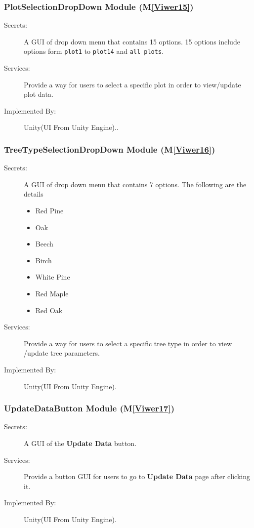 \documentclass[12pt, titlepage]{article}
\newcommand{\mref}[1]{M\ref{#1}}
\newcommand{\UUI}{Unity(UI From Unity Engine).}
\begin{document}
\subsubsection{PlotSelectionDropDown Module (\mref{Viwer15})}
\begin{description}
\item[Secrets:] A GUI of drop down menu that contains 15 options. 15 options include options
form \verb|plot1| to \verb|plot14| and \verb|all plots|.
\item[Services:] Provide a way for users to select a specific plot in order to view/update
plot data.
\item[Implemented By:] \UUI.
\end{description}

\subsubsection{TreeTypeSelectionDropDown Module (\mref{Viwer16})}
\begin{description}
\item[Secrets:] A GUI of drop down menu that contains 7 options. The following are the details
\begin{itemize}
\item Red Pine
\item Oak
\item Beech
\item Birch
\item White Pine
\item Red Maple
\item Red Oak
\end{itemize}

\item[Services:] Provide a way for users to select a specific tree type in order to view
/update tree parameters.
\item[Implemented By:] \UUI
\end{description}

\renewcommand\bt{\textbf{Update Data }}
\subsubsection{UpdateDataButton Module (\mref{Viwer17})}
\begin{description}
\item[Secrets:] A GUI of the \bt button.
\item[Services:] Provide a button GUI for users to go to \bt page after 
clicking it.
\item[Implemented By:]\UUI
\end{description}
\end{document}
